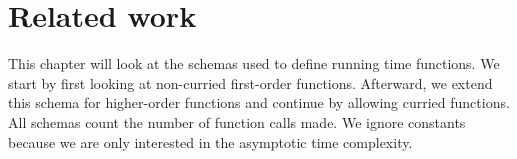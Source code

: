
\chapter{Related work}\label{chapter:relwork}

This chapter will look at the schemas used to define running time functions.
We start by first looking at non-curried first-order functions.
Afterward, we extend this schema for higher-order functions and continue by allowing curried functions.
All schemas count the number of function calls made.
We ignore constants because we are only interested in the asymptotic time complexity.




